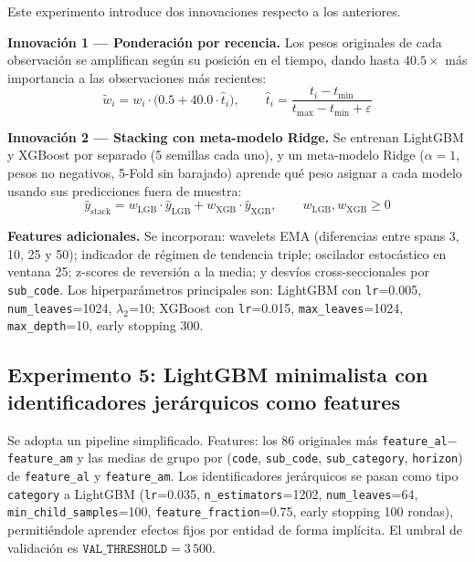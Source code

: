 \documentclass{article}
\begin{document}
Este experimento introduce dos innovaciones respecto a los anteriores.

\textbf{Innovación 1 — Ponderación por recencia.} Los pesos originales de cada observación se amplifican según su posición en el tiempo, dando hasta $40.5\times$ más importancia a las observaciones más recientes:
\begin{equation}
  \tilde{w}_i = w_i \cdot \bigl(0.5 + 40.0 \cdot \hat{t}_i\bigr), \qquad
  \hat{t}_i = \frac{t_i - t_{\min}}{t_{\max} - t_{\min} + \varepsilon}
  \label{eq:recency}
\end{equation}

\textbf{Innovación 2 — Stacking con meta-modelo Ridge.} Se entrenan LightGBM y XGBoost por separado (5 semillas cada uno), y un meta-modelo Ridge ($\alpha=1$, pesos no negativos, 5-Fold sin barajado) aprende qué peso asignar a cada modelo usando sus predicciones fuera de muestra:
\begin{equation}
  \hat{y}_{\text{stack}} = w_{\text{LGB}} \cdot \hat{y}_{\text{LGB}} + w_{\text{XGB}} \cdot \hat{y}_{\text{XGB}}, \qquad w_{\text{LGB}}, w_{\text{XGB}} \geq 0
  \label{eq:ridge_stack}
\end{equation}

\textbf{Features adicionales.} Se incorporan: wavelets EMA (diferencias entre spans 3, 10, 25 y 50); indicador de régimen de tendencia triple; oscilador estocástico en ventana 25; z-scores de reversión a la media; y desvíos cross-seccionales por \texttt{sub\_code}. Los hiperparámetros principales son: LightGBM con \texttt{lr}=0.005, \texttt{num\_leaves}=1024, $\lambda_2$=10; XGBoost con \texttt{lr}=0.015, \texttt{max\_leaves}=1024, \texttt{max\_depth}=10, early stopping 300.

\subsection{Experimento 5: LightGBM minimalista con identificadores jerárquicos como features}

Se adopta un pipeline simplificado. Features: los 86 originales más \texttt{feature\_al}$-$\texttt{feature\_am} y las medias de grupo por (\texttt{code}, \texttt{sub\_code}, \texttt{sub\_category}, \texttt{horizon}) de \texttt{feature\_al} y \texttt{feature\_am}. Los identificadores jerárquicos se pasan como tipo \texttt{category} a LightGBM (\texttt{lr}=0.035, \texttt{n\_estimators}=1202, \texttt{num\_leaves}=64, \texttt{min\_child\_samples}=100, \texttt{feature\_fraction}=0.75, early stopping 100 rondas), permitiéndole aprender efectos fijos por entidad de forma implícita. El umbral de validación es $\texttt{VAL\_THRESHOLD} = 3\,500$.
\end{document}
